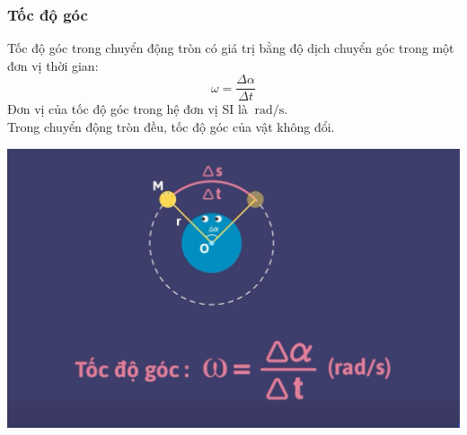 \subsubsection{Tốc độ góc}
Tốc độ góc trong chuyển động tròn có giá trị bằng độ dịch chuyển góc trong một đơn vị thời gian:
$$\omega = \frac{\Delta \alpha}{\Delta t}$$
Đơn vị của tốc độ góc trong hệ đơn vị SI là $\SI{}{\radian/\second}$.\\
Trong chuyển động tròn đều, tốc độ góc của vật không đổi. 
\begin{center}
	\includegraphics[scale=0.3]{../figs/VN10-PH-06-L-005-2-V2-02.jpg}
\end{center}
